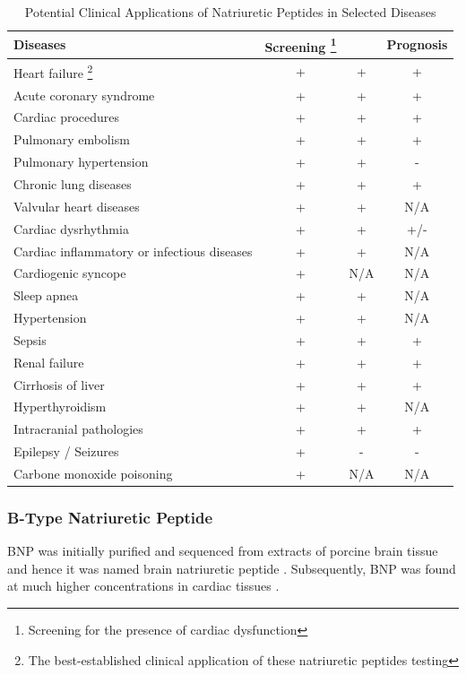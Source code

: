 \documentclass[14pt,a4paper,onecolumn]{extarticle}
\begin{document}
\begin{table}
    \centering
    \caption{Potential Clinical Applications of Natriuretic Peptides in Selected Diseases}
    \begin{tabular}{|l|c|c|c|}
        \hline
        Diseases & Screening \footnote{Screening for the presence of cardiac dysfunction} &  & Prognosis \\
        \hline
        Heart failure \footnote{The best-established clinical application of these natriuretic peptides testing} & + & + & + \\
        Acute coronary syndrome & + & + & + \\
        Cardiac procedures & + & + & + \\
        Pulmonary embolism & + & + & + \\
        Pulmonary hypertension & + & + & - \\
        Chronic lung diseases & + & + & + \\
        Valvular heart diseases & + & + & N/A \\
        Cardiac dysrhythmia & + & + & +/- \\
        Cardiac inflammatory or infectious diseases & + & + & N/A \\
        Cardiogenic syncope & + & N/A & N/A \\
        Sleep apnea & + & + & N/A \\
        Hypertension & + & + & N/A \\
        Sepsis & + & + & + \\
        Renal failure & + & + & + \\
        Cirrhosis of liver & + & + & + \\
        Hyperthyroidism & + & + & N/A \\
        Intracranial pathologies & + & + & + \\
        Epilepsy / Seizures & + & - & - \\
        Carbone monoxide poisoning & + & N/A & N/A \\
        \hline
    \end{tabular}
    \label{NP_applications}
\end{table}


\subsubsection{B-Type Natriuretic Peptide}
BNP was initially purified and sequenced from extracts of porcine brain tissue and hence it was named brain natriuretic peptide \citep{Sudoh1988}. Subsequently, BNP was found at much higher concentrations in cardiac tissues \citep{Mukoyama1991} \citep{Mukoyama1990}.
\end{document}
